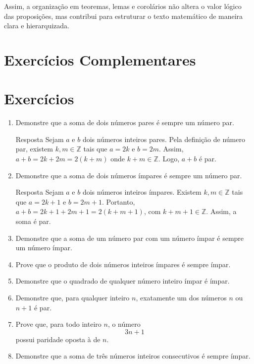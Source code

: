 \documentclass[12pt,a4paper,openright]{book}
\begin{document}
Assim, a organização em teoremas, lemas e corolários não altera o valor lógico das proposições, mas contribui para estruturar o texto matemático de maneira clara e hierarquizada.

\section{Exercícios Complementares}


\section*{Exercícios}

\begin{enumerate}

\item Demonstre que a soma de dois números pares é sempre um número par.
\begin{block}{Resposta}
Sejam $a$ e $b$ dois números inteiros pares. Pela definição de número par, existem
$k,m \in \mathbb{Z}$ tais que $a = 2k$ e $b = 2m$. Assim, $ a+b = 2k + 2m = 2(k+m)$
onde $k+m \in \mathbb{Z}$. Logo, $a+b$ é par.
\end{block}


\item Demonstre que a soma de dois números ímpares é sempre um número par.
\begin{block}{Resposta}
Sejam $a$ e $b$ dois números inteiros ímpares. Existem $k,m \in \mathbb{Z}$ tais que
$a = 2k+1$ e $b = 2m+1$. Portanto,
$a+b = 2k+1 + 2m+1 = 2(k+m+1)$,
com $k+m+1 \in \mathbb{Z}$. Assim, a soma é par.
\end{block}
\item Demonstre que a soma de um número par com um número ímpar é sempre um número ímpar.

\item Prove que o produto de dois números inteiros ímpares é sempre ímpar.

\item Demonstre que o quadrado de qualquer número inteiro ímpar é ímpar.

\item Demonstre que, para qualquer inteiro \( n \), exatamente um dos números \( n \) ou \( n+1 \) é par.

\item Prove que, para todo inteiro \( n \), o número
\[
3n + 1
\]
possui paridade oposta à de \( n \).

\item Demonstre que a soma de três números inteiros consecutivos é sempre ímpar.
\newpage
\end{enumerate}
\end{document}
